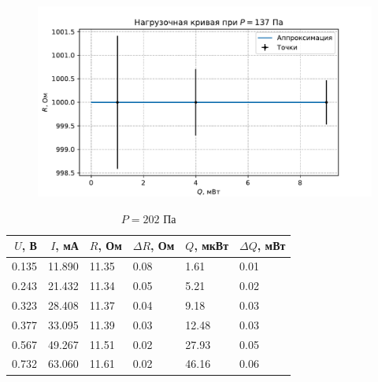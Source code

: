 \begin{figure}[H]\centering\includegraphics[width=\textwidth]{graphs/RQ136.694512232762.pdf}\end{figure}\begin{table}[H]
\centering
\caption{$P = 202$ Па}
\begin{tabular}{rrllll}
\hline
 $U$, В &  $I$, мА &     $R$, Ом & $\Delta R$, Ом &     $Q$, мкВт & $\Delta Q$, мВт \\ \hline
0.135 & 11.890 & 11.35 &           0.08 &  1.61 &            0.01 \\ \hline
0.243 & 21.432 & 11.34 &           0.05 &  5.21 &            0.02 \\ \hline
0.323 & 28.408 & 11.37 &           0.04 &  9.18 &            0.03 \\ \hline
0.377 & 33.095 & 11.39 &           0.03 & 12.48 &            0.03 \\ \hline
0.567 & 49.267 & 11.51 &           0.02 & 27.93 &            0.05 \\ \hline
0.732 & 63.060 & 11.61 &           0.02 & 46.16 &            0.06 \\ \hline
\end{tabular}
\end{table}

